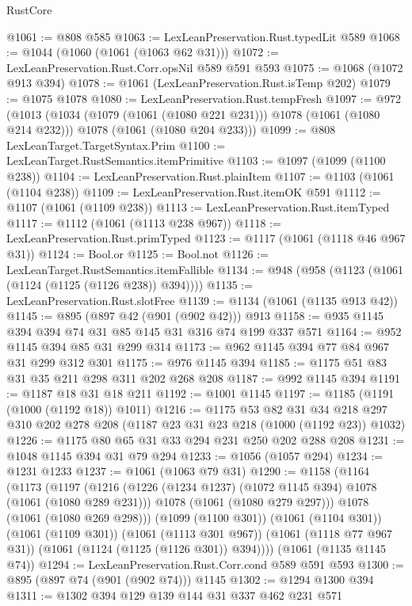\begin{lexlean}{RustCore}
\begin{coremodule}
@1061 := @808 @585
@1063 := LexLeanPreservation.Rust.typedLit @589
@1068 := @1044 (@1060 (@1061 (@1063 @62 @31)))
@1072 := LexLeanPreservation.Rust.Corr.opsNil @589 @591 @593
@1075 := @1068 (@1072 @913 @394)
@1078 := @1061 (LexLeanPreservation.Rust.isTemp @202)
@1079 := @1075 @1078
@1080 := LexLeanPreservation.Rust.tempFresh
@1097 := @972
    (@1013
      (@1034 (@1079 (@1061 (@1080 @221 @231))) @1078 (@1061 (@1080 @214 @232)))
      @1078
      (@1061 (@1080 @204 @233)))
@1099 := @808 LexLeanTarget.TargetSyntax.Prim
@1100 := LexLeanTarget.RustSemantics.itemPrimitive
@1103 := @1097 (@1099 (@1100 @238))
@1104 := LexLeanPreservation.Rust.plainItem
@1107 := @1103 (@1061 (@1104 @238))
@1109 := LexLeanPreservation.Rust.itemOK @591
@1112 := @1107 (@1061 (@1109 @238))
@1113 := LexLeanPreservation.Rust.itemTyped
@1117 := @1112 (@1061 (@1113 @238 @967))
@1118 := LexLeanPreservation.Rust.primTyped
@1123 := @1117 (@1061 (@1118 @46 @967 @31))
@1124 := Bool.or
@1125 := Bool.not
@1126 := LexLeanTarget.RustSemantics.itemFallible
@1134 := @948 (@958 (@1123 (@1061 (@1124 (@1125 (@1126 @238)) @394))))
@1135 := LexLeanPreservation.Rust.slotFree
@1139 := @1134 (@1061 (@1135 @913 @42))
@1145 := @895 (@897 @42 (@901 (@902 @42))) @913
@1158 := @935 @1145 @394 @394 @74 @31 @85 @145 @31 @316 @74 @199 @337 @571
@1164 := @952 @1145 @394 @85 @31 @299 @314
@1173 := @962 @1145 @394 @77 @84 @967 @31 @299 @312 @301
@1175 := @976 @1145 @394
@1185 := @1175 @51 @83 @31 @35 @211 @298 @311 @202 @268 @208
@1187 := @992 @1145 @394
@1191 := @1187 @18 @31 @18 @211
@1192 := @1001 @1145
@1197 := @1185 (@1191 (@1000 (@1192 @18)) @1011)
@1216 := @1175
    @53
    @82
    @31
    @34
    @218
    @297
    @310
    @202
    @278
    @208
    (@1187 @23 @31 @23 @218 (@1000 (@1192 @23)) @1032)
@1226 := @1175 @80 @65 @31 @33 @294 @231 @250 @202 @288 @208
@1231 := @1048 @1145 @394 @31 @79 @294
@1233 := @1056 (@1057 @294)
@1234 := @1231 @1233
@1237 := @1061 (@1063 @79 @31)
@1290 := @1158
    (@1164
      (@1173
        (@1197
          (@1216
            (@1226 (@1234 @1237) (@1072 @1145 @394) @1078 (@1061 (@1080 @289 @231)))
            @1078
            (@1061 (@1080 @279 @297)))
          @1078
          (@1061 (@1080 @269 @298)))
        (@1099 (@1100 @301))
        (@1061 (@1104 @301))
        (@1061 (@1109 @301))
        (@1061 (@1113 @301 @967))
        (@1061 (@1118 @77 @967 @31))
        (@1061 (@1124 (@1125 (@1126 @301)) @394))))
    (@1061 (@1135 @1145 @74))
@1294 := LexLeanPreservation.Rust.Corr.cond @589 @591 @593
@1300 := @895 (@897 @74 (@901 (@902 @74))) @1145
@1302 := @1294 @1300 @394
@1311 := @1302 @394 @129 @139 @144 @31 @337 @462 @231 @571

\end{coremodule}
\end{lexlean}

